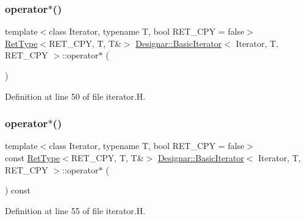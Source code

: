 \subsubsection{\texorpdfstring{operator$\ast$()}{operator*()}\hspace{0.1cm}{\footnotesize\ttfamily [1/2]}}
{\footnotesize\ttfamily template$<$class Iterator, typename T, bool R\+E\+T\+\_\+\+C\+PY = false$>$ \\
\hyperlink{namespace_designar_ab937f9c4bf5f1d0e65dbc616245d50ee}{Ret\+Type}$<$R\+E\+T\+\_\+\+C\+PY, T, T\&$>$ \hyperlink{class_designar_1_1_basic_iterator}{Designar\+::\+Basic\+Iterator}$<$ Iterator, T, R\+E\+T\+\_\+\+C\+PY $>$\+::operator$\ast$ (\begin{DoxyParamCaption}{ }\end{DoxyParamCaption})\hspace{0.3cm}{\ttfamily [inline]}}



Definition at line 50 of file iterator.\+H.

\mbox{\label{class_designar_1_1_basic_iterator_aa016cf79d8fd6b3e9f73c3dbbbaf7a31}} 
\subsubsection{\texorpdfstring{operator$\ast$()}{operator*()}\hspace{0.1cm}{\footnotesize\ttfamily [2/2]}}
{\footnotesize\ttfamily template$<$class Iterator, typename T, bool R\+E\+T\+\_\+\+C\+PY = false$>$ \\
const \hyperlink{namespace_designar_ab937f9c4bf5f1d0e65dbc616245d50ee}{Ret\+Type}$<$R\+E\+T\+\_\+\+C\+PY, T, T\&$>$ \hyperlink{class_designar_1_1_basic_iterator}{Designar\+::\+Basic\+Iterator}$<$ Iterator, T, R\+E\+T\+\_\+\+C\+PY $>$\+::operator$\ast$ (\begin{DoxyParamCaption}{ }\end{DoxyParamCaption}) const\hspace{0.3cm}{\ttfamily [inline]}}



Definition at line 55 of file iterator.\+H.

\mbox{\label{class_designar_1_1_basic_iterator_ac87226512fbbe7c524cc0be8ae2ee914}} 
